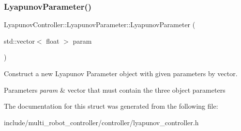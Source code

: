 \subsubsection{\texorpdfstring{Lyapunov\+Parameter()}{LyapunovParameter()}}
{\footnotesize\ttfamily Lyapunov\+Controller\+::\+Lyapunov\+Parameter\+::\+Lyapunov\+Parameter (\begin{DoxyParamCaption}\item[{std\+::vector$<$ float $>$}]{param }\end{DoxyParamCaption})\hspace{0.3cm}{\ttfamily [inline]}}



Construct a new Lyapunov Parameter object with given parameters by vector. 


\begin{DoxyParams}{Parameters}
{\em param} & vector that must contain the three object parameters \\
\hline
\end{DoxyParams}


The documentation for this struct was generated from the following file\+:\begin{DoxyCompactItemize}
\item 
include/multi\+\_\+robot\+\_\+controller/controller/lyapunov\+\_\+controller.\+h\end{DoxyCompactItemize}
